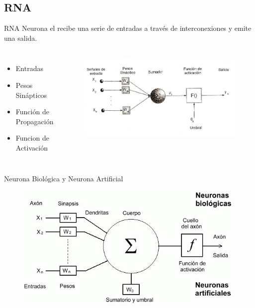 \documentclass{beamer}
\begin{document}
\subsection{RNA}
\begin{frame}{RNA}
Neurona el recibe una serie de entradas a través de interconexiones y emite una salida.\pause
\begin{columns}
\begin{itemize}
\item {Entradas\pause}
\item {Pesos Sinápticos\pause}
\item {Función de Propagación\pause}
\item {Funcion de Activación\pause}
\end{itemize}
\begin{figure}
\includegraphics[scale=0.23]{rna.png}
\end{figure}
\end{columns}
\end{frame}

\begin{frame}
\begin{block}{Neurona Biológica y Neurona Artificial}
\begin{figure}
\includegraphics[scale=0.4]{Rna.png}
\centering
\end{figure}
\end{block}
\end{frame}
\end{document}
